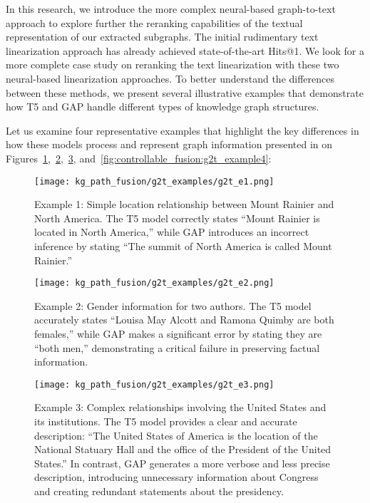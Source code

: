 In this research, we introduce the more complex neural-based graph-to-text approach to explore further the reranking capabilities of the textual representation of our extracted subgraphs. The initial rudimentary text linearization approach has already achieved state-of-the-art Hits@1. We look for a more complete case study on reranking the text linearization with these two neural-based linearization approaches. To better understand the differences between these methods, we present several illustrative examples that demonstrate how T5 and GAP handle different types of knowledge graph structures.

Let us examine four representative examples that highlight the key differences in how these models process and represent graph information presented in on Figures~\ref{fig:controllable_fusion:g2t_example1},~\ref{fig:controllable_fusion:g2t_example2},~\ref{fig:controllable_fusion:g2t_example3}, and~\ref{fig:controllable_fusion:g2t_example4}:

\begin{figure}[!htb]
    \centering
    \texttt{[image: kg\_path\_fusion/g2t\_examples/g2t\_e1.png]}
    \caption{Example 1: Simple location relationship between Mount Rainier and North America. The T5 model correctly states ``Mount Rainier is located in North America,'' while GAP introduces an incorrect inference by stating ``The summit of North America is called Mount Rainier.''}
    \label{fig:controllable_fusion:g2t_example1}
\end{figure}

\begin{figure}[!htb]
    \centering
    \texttt{[image: kg\_path\_fusion/g2t\_examples/g2t\_e2.png]}
    \caption{Example 2: Gender information for two authors. The T5 model accurately states ``Louisa May Alcott and Ramona Quimby are both females,'' while GAP makes a significant error by stating they are ``both men,'' demonstrating a critical failure in preserving factual information.}
    \label{fig:controllable_fusion:g2t_example2}
\end{figure}

\begin{figure}[!htb]
    \centering
    \texttt{[image: kg\_path\_fusion/g2t\_examples/g2t\_e3.png]}
    \caption{Example 3: Complex relationships involving the United States and its institutions. The T5 model provides a clear and accurate description: ``The United States of America is the location of the National Statuary Hall and the office of the President of the United States.'' In contrast, GAP generates a more verbose and less precise description, introducing unnecessary information about Congress and creating redundant statements about the presidency.}
    \label{fig:controllable_fusion:g2t_example3}
\end{figure}

